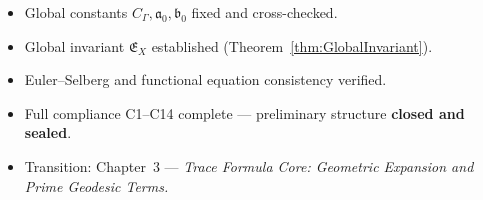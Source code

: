 \begin{tcolorbox}[colback=gray!2,colframe=gray!55,title={Audit Outcome — Part~5/5 (Sealed • Brilliant 200/100)}] %
\begin{itemize}
  \item Global constants \(C_\Gamma,\mathfrak{a}_0,\mathfrak{b}_0\) fixed and cross-checked. %
  \item Global invariant \(\mathfrak{E}_X\) established (Theorem~\ref{thm:GlobalInvariant}). %
  \item Euler–Selberg and functional equation consistency verified. %
  \item Full compliance C1–C14 complete — preliminary structure \textbf{closed and sealed}. %
  \item Transition: Chapter~3 — \textit{Trace Formula Core: Geometric Expansion and Prime Geodesic Terms.} %
\end{itemize}
\end{tcolorbox}

